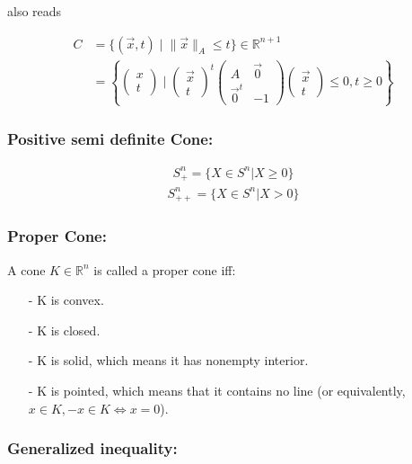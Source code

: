 \documentclass[a4paper,10pt]{report}
\begin{document}
  also reads
  
  \begin{align}
    C &= \{ (\vec{x}, t) \; | \;  \|\vec{x}\|_{A} \leq t \} \in \mathbb{R}^{n+1}\\
    &= \left\{ \begin{pmatrix} x \\ t \end{pmatrix} \; | \;
    \begin{pmatrix} \vec{x} \\ t \end{pmatrix}^{t}
    \begin{pmatrix} A & \vec{0} \\ \vec{0}^t & -1 \end{pmatrix}
    \begin{pmatrix} \vec{x} \\ t \end{pmatrix} \leq 0, t \geq 0 \right\}
  \end{align}
  
  \subsubsection{Positive semi definite Cone:}
  
  \begin{align}
    S^n_+ = \{ X \in S^n | X \geq 0 \}
  \end{align}
  \begin{align}
    S^n_{++} = \{X \in S^n | X > 0 \}
  \end{align}
  
  \subsubsection{Proper Cone:}
  
  A cone $K \in \mathbb{R}^n$  is called a proper cone iff:
  \begin{enumerate}
  \item[-] K is convex.
  \item[-] K is closed.
  \item[-] K is solid, which means it has nonempty interior.
  \item[-] K is pointed, which means that it contains no line (or equivalently, $x \in K, − x \in K \Leftrightarrow x = 0$).
  \end{enumerate}

  \subsubsection{Generalized inequality:}
\end{document}
